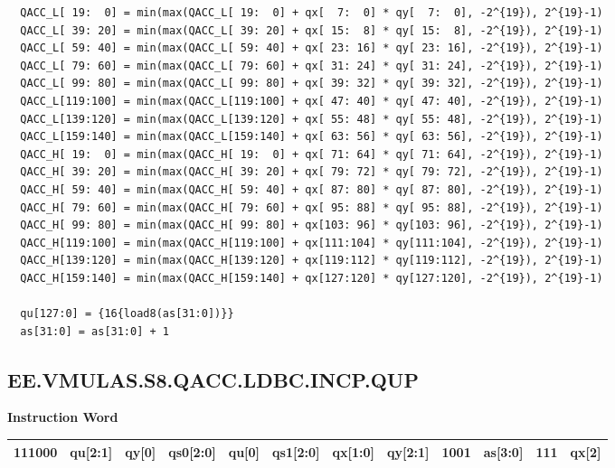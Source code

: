 \begin{lstlisting}
  QACC_L[ 19:  0] = min(max(QACC_L[ 19:  0] + qx[  7:  0] * qy[  7:  0], -2^{19}), 2^{19}-1)
  QACC_L[ 39: 20] = min(max(QACC_L[ 39: 20] + qx[ 15:  8] * qy[ 15:  8], -2^{19}), 2^{19}-1)
  QACC_L[ 59: 40] = min(max(QACC_L[ 59: 40] + qx[ 23: 16] * qy[ 23: 16], -2^{19}), 2^{19}-1)
  QACC_L[ 79: 60] = min(max(QACC_L[ 79: 60] + qx[ 31: 24] * qy[ 31: 24], -2^{19}), 2^{19}-1)
  QACC_L[ 99: 80] = min(max(QACC_L[ 99: 80] + qx[ 39: 32] * qy[ 39: 32], -2^{19}), 2^{19}-1)
  QACC_L[119:100] = min(max(QACC_L[119:100] + qx[ 47: 40] * qy[ 47: 40], -2^{19}), 2^{19}-1)
  QACC_L[139:120] = min(max(QACC_L[139:120] + qx[ 55: 48] * qy[ 55: 48], -2^{19}), 2^{19}-1)
  QACC_L[159:140] = min(max(QACC_L[159:140] + qx[ 63: 56] * qy[ 63: 56], -2^{19}), 2^{19}-1)
  QACC_H[ 19:  0] = min(max(QACC_H[ 19:  0] + qx[ 71: 64] * qy[ 71: 64], -2^{19}), 2^{19}-1)
  QACC_H[ 39: 20] = min(max(QACC_H[ 39: 20] + qx[ 79: 72] * qy[ 79: 72], -2^{19}), 2^{19}-1)
  QACC_H[ 59: 40] = min(max(QACC_H[ 59: 40] + qx[ 87: 80] * qy[ 87: 80], -2^{19}), 2^{19}-1)
  QACC_H[ 79: 60] = min(max(QACC_H[ 79: 60] + qx[ 95: 88] * qy[ 95: 88], -2^{19}), 2^{19}-1)
  QACC_H[ 99: 80] = min(max(QACC_H[ 99: 80] + qx[103: 96] * qy[103: 96], -2^{19}), 2^{19}-1)
  QACC_H[119:100] = min(max(QACC_H[119:100] + qx[111:104] * qy[111:104], -2^{19}), 2^{19}-1)
  QACC_H[139:120] = min(max(QACC_H[139:120] + qx[119:112] * qy[119:112], -2^{19}), 2^{19}-1)
  QACC_H[159:140] = min(max(QACC_H[159:140] + qx[127:120] * qy[127:120], -2^{19}), 2^{19}-1)

  qu[127:0] = {16{load8(as[31:0])}}
  as[31:0] = as[31:0] + 1
\end{lstlisting}

\clearpage
\subsection{EE.VMULAS.S8.QACC.LDBC.INCP.QUP}\label{instruction:EEVMULASS8QACCLDBCINCPQUP}
\setlength\tabcolsep{6pt}
\textbf{Instruction Word} \\
\begin{tabular}{|c|c|c|c|c|c|c|c|c|c|c|c|}
	\hline
	111000 & qu[2:1] & qy[0] & qs0[2:0] & qu[0] & qs1[2:0] & qx[1:0] & qy[2:1] & 1001 & as[3:0] & 111 & qx[2] \\
	\hline
\end{tabular}

